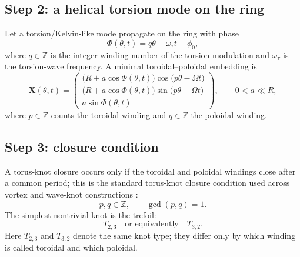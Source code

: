 \documentclass[11pt,a4paper]{article}
\begin{document}
    \subsection{Step 2: a helical torsion mode on the ring}
        Let a torsion/Kelvin-like mode propagate on the ring with phase
        \begin{equation}
            \Phi(\theta,t)=q\theta-\omega_\tau t+\phi_0,
            \label{eq:poloidalphaseTrefoil}
        \end{equation}
        where \(q\in\mathbb Z\) is the integer winding number of the torsion modulation and \(\omega_\tau\) is the torsion-wave frequency. A minimal toroidal--poloidal embedding is
        \begin{equation}
            \mathbf{X}(\theta,t)
            =
            \begin{pmatrix}
                \bigl(R+a\cos\Phi(\theta,t)\bigr)\cos\!\bigl(p\theta-\Omega t\bigr)\\[4pt]
                \bigl(R+a\cos\Phi(\theta,t)\bigr)\sin\!\bigl(p\theta-\Omega t\bigr)\\[4pt]
                a\sin\Phi(\theta,t)
            \end{pmatrix},
            \qquad 0<a\ll R,
            \label{eq:torusknotansatzTrefoil}
        \end{equation}
        where \(p\in\mathbb Z\) counts the toroidal winding and \(q\in\mathbb Z\) the poloidal winding.
    
    \subsection{Step 3: closure condition}
        A torus-knot closure occurs only if the toroidal and poloidal windings close after a common period; this is the standard torus-knot closure condition used across vortex and wave-knot constructions \cite{Kedia2013,BerryDennis2001}:
        \begin{equation}
            p,q\in\mathbb Z,
            \qquad
            \gcd(p,q)=1.
            \label{eq:torusknotclosureTrefoil}
        \end{equation}
        The simplest nontrivial knot is the trefoil:
        \begin{equation}
            T_{2,3}\quad\text{or equivalently}\quad T_{3,2}.
            \label{eq:trefoiltypesTrefoil}
        \end{equation}
        Here \(T_{2,3}\) and \(T_{3,2}\) denote the same knot type; they differ only by which winding is called toroidal and which poloidal.
    
\end{document}
